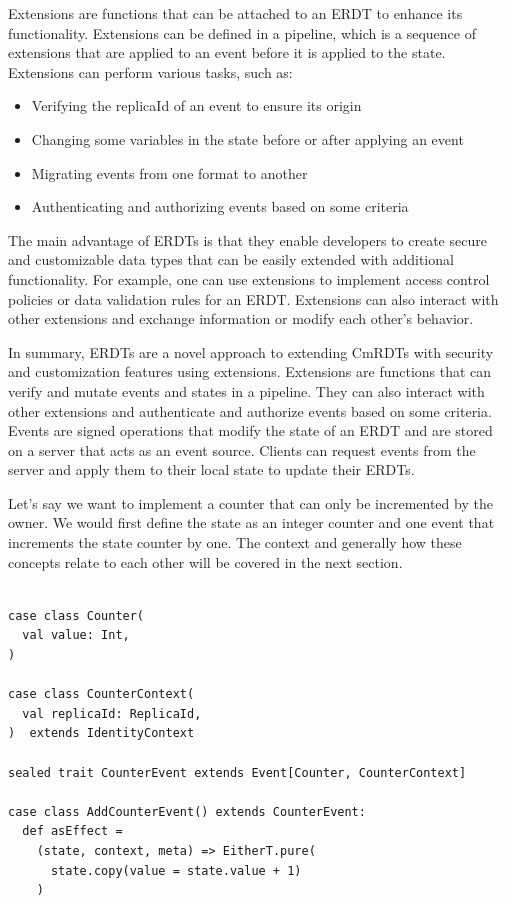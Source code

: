 \documentclass[
	ngerman,
	ruledheaders=section,   %
	class=report,		    %
	thesis={type=bachelor}, %
	accentcolor=9c,			%
	custommargins=true,    %
	marginpar=false,        %
	parskip=half-,          %
	fontsize=11pt,          %
]{tudapub}
\begin{document}
Extensions are functions that can be attached to an ERDT to enhance its functionality. Extensions can be defined in a pipeline, which is a sequence of extensions that are applied to an event before it is applied to the state. Extensions can perform various tasks, such as:

\begin{itemize}
  \item Verifying the replicaId of an event to ensure its origin
  \item Changing some variables in the state before or after applying an event
  \item Migrating events from one format to another
  \item Authenticating and authorizing events based on some criteria
\end{itemize}

The main advantage of ERDTs is that they enable developers to create secure and customizable data types that can be easily extended with additional functionality. For example, one can use extensions to implement access control policies or data validation rules for an ERDT. Extensions can also interact with other extensions and exchange information or modify each other’s behavior.

In summary, ERDTs are a novel approach to extending CmRDTs with security and customization features using extensions. Extensions are functions that can verify and mutate events and states in a pipeline. They can also interact with other extensions and authenticate and authorize events based on some criteria. Events are signed operations that modify the state of an ERDT and are stored on a server that acts as an event source. Clients can request events from the server and apply them to their local state to update their ERDTs.


Let's say we want to implement a counter that can only be incremented by the owner. We would first define the state as an integer counter and one event that increments the state counter by one. The context and generally how these concepts relate to each other will be covered in the next section.

\begin{lstlisting}
    
case class Counter(
  val value: Int,
) 

case class CounterContext(
  val replicaId: ReplicaId,
)  extends IdentityContext

sealed trait CounterEvent extends Event[Counter, CounterContext]

case class AddCounterEvent() extends CounterEvent:
  def asEffect =
    (state, context, meta) => EitherT.pure(
      state.copy(value = state.value + 1)
    )

\end{lstlisting}
\end{document}
